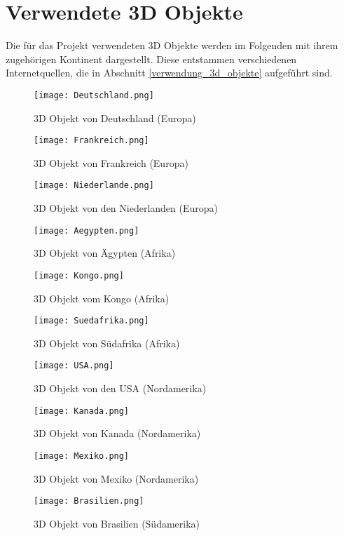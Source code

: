 \section{Verwendete 3D Objekte}
Die für das Projekt verwendeten 3D Objekte werden im Folgenden mit ihrem zugehörigen Kontinent dargestellt. Diese entstammen verschiedenen Internetquellen, die in Abschnitt \ref{verwendung_3d_objekte} aufgeführt sind.

\begin{figure}[!htb]
  \texttt{[image: Deutschland.png]}
  \caption{3D Objekt von Deutschland (Europa)}\label{fig:deutschland}
\endminipage\hfill
{}
  \texttt{[image: Frankreich.png]}
  \caption{3D Objekt von Frankreich (Europa)}\label{fig:frankreich}
\endminipage\hfill
\end{figure}

\begin{figure}[!htb]
  \texttt{[image: Niederlande.png]}
  \caption{3D Objekt von den Niederlanden (Europa)}\label{fig:niederlande}
\endminipage\hfill
{}
  \texttt{[image: Aegypten.png]}
  \caption{3D Objekt von Ägypten (Afrika)}\label{fig:aegypten}
\endminipage\hfill
\end{figure}

\begin{figure}[!htb]
  \texttt{[image: Kongo.png]}
  \caption{3D Objekt vom Kongo (Afrika)}\label{fig:kongo}
\endminipage\hfill
{}
  \texttt{[image: Suedafrika.png]}
  \caption{3D Objekt von Südafrika (Afrika)}\label{fig:suedafrika}
\endminipage\hfill
\end{figure}

\begin{figure}[!htb]
  \texttt{[image: USA.png]}
  \caption{3D Objekt von den USA (Nordamerika)}\label{fig:usa}
\endminipage\hfill
{}
  \texttt{[image: Kanada.png]}
  \caption{3D Objekt von Kanada (Nordamerika)}\label{fig:kanada}
\endminipage\hfill
\end{figure}

\begin{figure}[!htb]
  \texttt{[image: Mexiko.png]}
  \caption{3D Objekt von Mexiko (Nordamerika)}\label{fig:mexiko}
\endminipage\hfill
{}
  \texttt{[image: Brasilien.png]}
  \caption{3D Objekt von Brasilien (Südamerika)}\label{fig:brasilien}
\endminipage\hfill
\end{figure}

